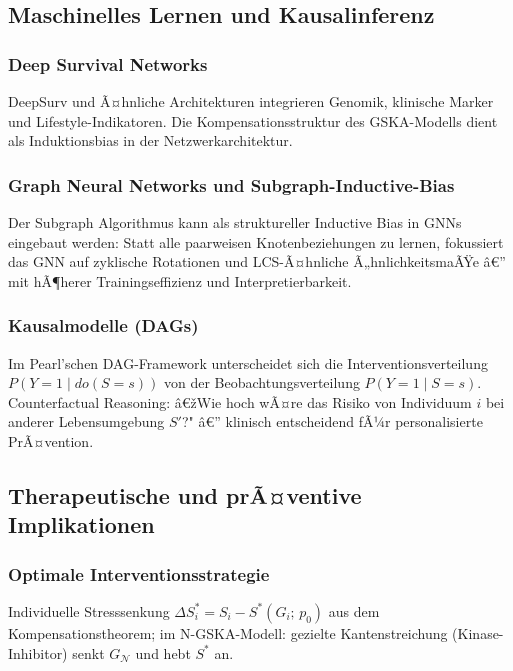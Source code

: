 ﻿\documentclass[12pt, a4paper]{article}
\theoremstyle{definition}
\theoremstyle{remark}
\newcommand{\calN}{\mathcal{N}}
\newcommand{\GN}{G_{\calN}}
\begin{document}
\subsection{Maschinelles Lernen und Kausalinferenz}

\subsubsection{Deep Survival Networks}

DeepSurv und Ã¤hnliche Architekturen integrieren Genomik, klinische Marker und
Lifestyle-Indikatoren. Die Kompensationsstruktur des GSKA-Modells dient als
Induktionsbias in der Netzwerkarchitektur.

\subsubsection{Graph Neural Networks und Subgraph-Inductive-Bias}

Der Subgraph Algorithmus kann als struktureller Inductive Bias in GNNs eingebaut
werden: Statt alle paarweisen Knotenbeziehungen zu lernen, fokussiert das GNN auf
zyklische Rotationen und LCS-Ã¤hnliche Ã„hnlichkeitsmaÃŸe â€” mit hÃ¶herer
Trainingseffizienz und Interpretierbarkeit.

\subsubsection{Kausalmodelle (DAGs)}

Im Pearl'schen DAG-Framework unterscheidet sich die Interventionsverteilung
$P(Y=1 \mid do(S=s))$ von der Beobachtungsverteilung $P(Y=1 \mid S=s)$.
Counterfactual Reasoning: â€žWie hoch wÃ¤re das Risiko von Individuum $i$ bei
anderer Lebensumgebung $S'$?" â€” klinisch entscheidend fÃ¼r personalisierte PrÃ¤vention.

\subsection{Therapeutische und prÃ¤ventive Implikationen}

\subsubsection{Optimale Interventionsstrategie}

Individuelle Stresssenkung $\Delta S_i^* = S_i - S^*(G_i;\,p_0)$ aus dem
Kompensationstheorem; im N-GSKA-Modell: gezielte Kantenstreichung
(Kinase-Inhibitor) senkt $\GN$ und hebt $S^*$ an.
\end{document}
